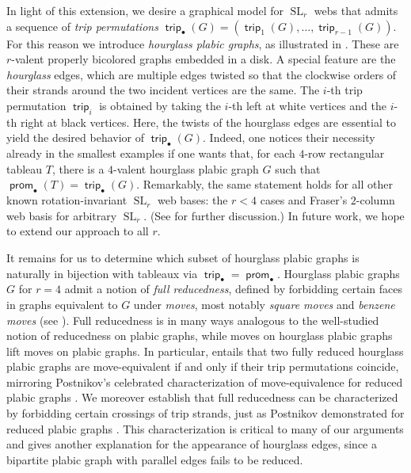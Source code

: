 \documentclass{amsart}
\theoremstyle{definition}
\theoremstyle{remark}
\numberwithin{equation}{section}
\DeclareMathOperator{\trip}{\mathsf{trip}}
\DeclareMathOperator{\prom}{\mathsf{prom}}
\DeclareMathOperator{\SL}{SL}
\begin{document}
In light of this extension, we desire a graphical model for $\SL_r$ webs that admits a sequence of \emph{trip permutations} $\trip_\bullet(G) = (\trip_1(G), \ldots, \trip_{r-1}(G))$. For this reason we introduce \emph{hourglass plabic graphs}, as illustrated in . These are $r$-valent properly bicolored graphs embedded in a disk. A special feature are the \emph{hourglass} edges, which are multiple edges twisted so that the clockwise orders of their strands around the two incident vertices are the same. The $i$-th trip permutation $\trip_i$ is obtained by taking the $i$-th left at white vertices and the $i$-th right at black vertices. Here, the twists of the hourglass edges are essential to yield the desired behavior of $\trip_\bullet(G)$. Indeed, one notices their necessity already in the smallest examples if one wants that, for each $4$-row rectangular tableau $T$, there is a $4$-valent hourglass plabic graph $G$ such that $\prom_\bullet(T) = \trip_\bullet(G)$. Remarkably, the same statement holds for all other known rotation-invariant $\SL_r$ web bases:  the $r < 4$ cases and Fraser's \cite{Fraser-2-column} $2$-column web basis for arbitrary $\SL_r$. (See  for further discussion.) In future work, we hope to extend our approach to all $r$.

It remains for us to determine which subset of hourglass plabic graphs is naturally in bijection with tableaux via $\trip_{\bullet}=\prom_{\bullet}$. Hourglass plabic graphs $G$ for $r = 4$ admit a notion of \emph{full reducedness}, defined by forbidding certain faces in graphs equivalent to $G$ under \emph{moves}, most notably \textit{square moves} and \textit{benzene moves} (see ). Full reducedness is in many ways analogous to the well-studied notion of reducedness on plabic graphs, while moves on hourglass plabic graphs lift moves on plabic graphs. In particular,  entails that two fully reduced hourglass plabic graphs are move-equivalent if and only if their trip permutations coincide, mirroring Postnikov's celebrated characterization of move-equivalence for reduced plabic graphs \cite[Thm.~13.4]{Postnikov-arxiv}. We moreover establish that full reducedness can be characterized by forbidding certain crossings of trip strands, just as Postnikov demonstrated for reduced plabic graphs \cite[Thm.~13.2]{Postnikov-arxiv}. This characterization is critical to many of our arguments and gives another explanation for the appearance of hourglass edges, since a bipartite plabic graph with parallel edges fails to be reduced.  
\end{document}
